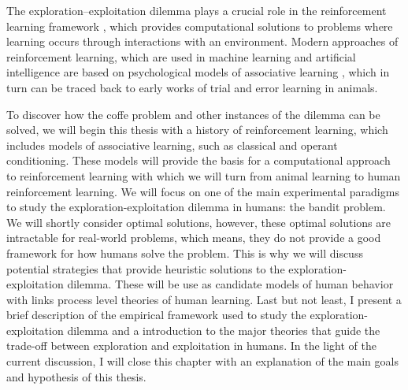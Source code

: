 
The exploration--exploitation dilemma plays a crucial role in the reinforcement learning framework \citep{sutton2018reinforcement}, which provides computational solutions to problems where learning occurs through interactions with an environment. Modern approaches of reinforcement learning, which are used in machine learning and artificial intelligence are based on psychological models of associative learning \citep{sutton2018reinforcement}, which in turn can be traced back to early works of trial and error learning in animals. 

To discover how the coffe problem and other instances of the dilemma can be solved, we will begin this thesis with a history of reinforcement learning, which includes models of associative learning, such as classical and operant conditioning.
These models will provide the basis for a computational approach to reinforcement learning with which we will turn from animal learning to human reinforcement learning. We will focus on one of the main experimental paradigms to study the exploration-exploitation dilemma in humans: the bandit problem. We will shortly consider optimal solutions, however, these optimal solutions are intractable for real-world problems, which means, they do not provide a good framework for how humans solve the problem. 
This is why we will discuss potential strategies that provide heuristic solutions to the exploration-exploitation dilemma. These will be use as candidate models of human behavior with links process level theories of human learning.
Last but not least, I present a brief description of the empirical framework used to study the exploration-exploitation dilemma and a introduction to the major theories that guide the trade-off between exploration and exploitation in humans. In the light of the current discussion, I will close this chapter with an explanation of the main goals and hypothesis of this thesis. 

